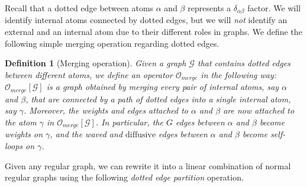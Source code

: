 \documentclass{article}
\newcommand{\1}{\mathds{1}}
\numberwithin{equation}{section}
\newcommand{\al}{\alpha}
\newcommand{\be}{\begin{equation}}
\newcommand{\ee}{\end{equation}}
\newcommand{\rDot}{\mathbf {rDot}}
\renewcommand{\cal}{\mathcal}
\newcommand{\dashed}{\text{diffusive}}
\theoremstyle{plain} %
\newtheorem{definition}[theorem]{Definition}
\theoremstyle{remark}
\newtheorem{remark}[theorem]{Remark}
\newcommand{\cor}{\color{red}}
\newcommand{\hty}[1]{{\cor (ht: #1) }}
\begin{document}
%  	
%  	
%  	


Recall that a dotted edge between atoms $\al$ and $\beta$ represents a $\delta_{\al\beta}$ factor. We will identify internal atoms  connected by dotted edges, but we will {\it not} identify an external and an internal atom due to their different roles in graphs. We define the following simple merging operation regarding dotted edges. 
\begin{definition}[Merging operation]\label{def merge}
	Given a graph $\cal G$ that contains dotted edges between different atoms, we define an operator $\cal O_{merge}$ in the following way: $\cal O_{merge}[\cal G]$ is a graph obtained by merging every pair of internal atoms, say $\al$ and $\beta$, that are connected by a path of dotted edges into a single internal atom, say $\gamma$. Moreover, the weights and edges attached to $\al$ and $\beta$ %
	are now attached to the atom $\gamma$ 
	in $\cal O_{merge}[\cal G]$. In particular, the $G$ edges between $\al$ and $\beta$ become weights on $\gamma$, and the waved and $\dashed$ edges between $\al$ and $\beta$ become self-loops on $\gamma$. 
\end{definition}
Given any regular graph, we can rewrite it into a linear combination of normal regular graphs using the following \emph{dotted edge partition} operation. 
\end{document}

